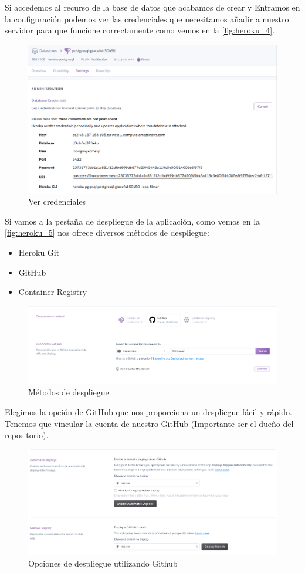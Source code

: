 Si accedemos al recurso de la base de datos que acabamos de crear y Entramos
 en la configuración podemos ver las credenciales que necesitamos añadir a
 nuestro servidor para que funcione correctamente como vemos en la
 \autoref{fig:heroku_4}.
\begin{figure}[H]
    \centering
    \includegraphics[width=6in]{figures/appendix-A/heroku_4.png}
    \caption{Ver credenciales}
    \label{fig:heroku_4}
\end{figure}
Si vamos a la pestaña de despliegue de la aplicación, como vemos en la
 \autoref{fig:heroku_5} nos ofrece diversos métodos de
 despliegue:
\begin{itemize}
    \item Heroku Git
    \item GitHub
    \item Container Registry
\end{itemize}
\begin{figure}[H]
    \centering
    \includegraphics[width=6in]{figures/appendix-A/heroku_5.png}
    \caption{Métodos de despliegue}
    \label{fig:heroku_5}
\end{figure}
Elegimos la opción de GitHub que nos proporciona un despliegue fácil y rápido.
Tenemos que vincular la cuenta de nuestro GitHub (Importante ser el dueño del
 repositorio).
\begin{figure}[H]
    \centering
    \includegraphics[width=6in]{figures/appendix-A/heroku_6.png}
    \caption{Opciones de despliegue utilizando Github}
    \label{fig:heroku_6}
\end{figure}
